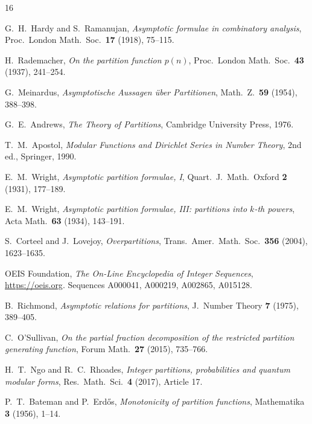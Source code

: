 \documentclass[11pt,a4paper]{article}
\begin{document}
\begin{thebibliography}{16}

G.~H.~Hardy and S.~Ramanujan,
\textit{Asymptotic formulae in combinatory analysis},
Proc.\ London Math.\ Soc.\ \textbf{17} (1918), 75--115.

H.~Rademacher,
\textit{On the partition function $p(n)$},
Proc.\ London Math.\ Soc.\ \textbf{43} (1937), 241--254.

G.~Meinardus,
\textit{Asymptotische Aussagen \"uber Partitionen},
Math.\ Z.\ \textbf{59} (1954), 388--398.

G.~E.~Andrews,
\emph{The Theory of Partitions},
Cambridge University Press, 1976.

T.~M.~Apostol,
\emph{Modular Functions and Dirichlet Series in Number Theory},
2nd ed., Springer, 1990.

E.~M.~Wright,
\textit{Asymptotic partition formulae, I},
Quart.\ J.\ Math.\ Oxford \textbf{2} (1931), 177--189.

E.~M.~Wright,
\textit{Asymptotic partition formulae, III: partitions into $k$-th powers},
Acta Math.\ \textbf{63} (1934), 143--191.

S.~Corteel and J.~Lovejoy,
\textit{Overpartitions},
Trans.\ Amer.\ Math.\ Soc.\ \textbf{356} (2004), 1623--1635.

OEIS Foundation,
\emph{The On-Line Encyclopedia of Integer Sequences},
\url{https://oeis.org}. Sequences A000041, A000219, A002865, A015128.

B.~Richmond,
\textit{Asymptotic relations for partitions},
J.\ Number Theory \textbf{7} (1975), 389--405.

C.~O'Sullivan,
\textit{On the partial fraction decomposition of the restricted partition generating function},
Forum Math.\ \textbf{27} (2015), 735--766.

H.~T.~Ngo and R.~C.~Rhoades,
\textit{Integer partitions, probabilities and quantum modular forms},
Res.\ Math.\ Sci.\ \textbf{4} (2017), Article 17.

P.~T.~Bateman and P.~Erd\H{o}s,
\textit{Monotonicity of partition functions},
Mathematika \textbf{3} (1956), 1--14.


\end{thebibliography}
\end{document}

